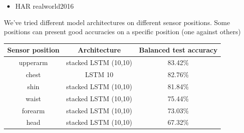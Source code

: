 \documentclass[landscape,a3,final,24pt]{issposter}
\begin{document}
\begin{multicols}{3}
\columnbreak
\begin{itemize}
\item HAR realworld2016\end{itemize}
We've tried different model architectures on different sensor positions. Some positions can present good accuracies on a specific position (one against others)
\begin{center}
\begin{tabular}{ccc}
   \toprule
  Sensor position& Architecture  &  Balanced test accuracy \\
  \midrule
  upperarm &stacked LSTM (10,10) &83.42\% \\
   chest &LSTM 10 &82.76\% \\
   shin &stacked LSTM (10,10)&81.84\% \\
   waist &stacked LSTM (10,10)&75.44\% \\
   forearm &stacked LSTM (10,10)& 73.03\% \\
  head &stacked LSTM (10,10)&67.32\%  \\
   \bottomrule
\end{tabular}
\end{center}
\begin{figure}[htbp]
\centering
{}
\quad
\subfigure[chest]{
}
\end{figure}
\end{multicols}
\end{document}
